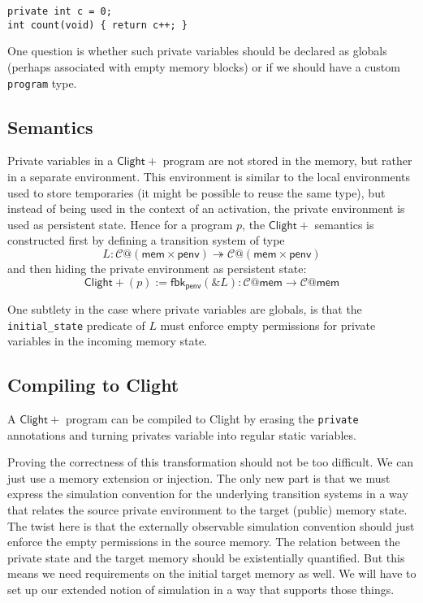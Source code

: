 \documentclass[acmsmall,screen,review,anonymous]{acmart}
\newcommand{\ClightP}{\ensuremath{\mathsf{Clight+}}}
\begin{document}
\begin{verbatim}
private int c = 0;
int count(void) { return c++; }
\end{verbatim}

One question is whether such private variables
should be declared as globals
(perhaps associated with empty memory blocks)
or if we should have a custom \texttt{program} type.

\subsection{Semantics}

Private variables in a \ClightP{} program
are not stored in the memory,
but rather in a separate environment.
This environment is similar to
the local environments used to store temporaries
(it might be possible to reuse the same type),
but instead of being used in the context of an activation,
the private environment is used as persistent state.
Hence for a program $p$, the \ClightP{} semantics is constructed
first by defining a transition system of type
\[
  L : \mathcal{C}@(\mathsf{mem}\times\mathsf{penv}) \twoheadrightarrow
      \mathcal{C}@(\mathsf{mem}\times\mathsf{penv})
\]
and then hiding the private environment as persistent state:
\[
  \ClightP{}(p) := \mathsf{fbk}_\mathsf{penv}(\&L) :
    \mathcal{C}@\mathsf{mem} \rightarrow
    \mathcal{C}@\mathsf{mem}
\]

One subtlety in the case where private variables are globals,
is that the \texttt{initial\_state} predicate of $L$
must enforce empty permissions for private variables
in the incoming memory state.

\subsection{Compiling to Clight}

A \ClightP{} program can be compiled to Clight
by erasing the \texttt{private} annotations
and turning privates variable into regular
static variables.

Proving the correctness of this transformation
should not be too difficult.
We can just use a memory extension or injection.
The only new part is that we must express
the simulation convention for the underlying transition systems
in a way that relates the source private environment
to the target (public) memory state.
The twist here is that
the externally observable simulation convention
should just enforce the empty permissions in the source memory.
The relation between the private state and the target memory
should be existentially quantified.
But this means we need requirements on the initial target memory as well.
We will have to set up our extended notion of simulation
in a way that supports those things.
\end{document}
